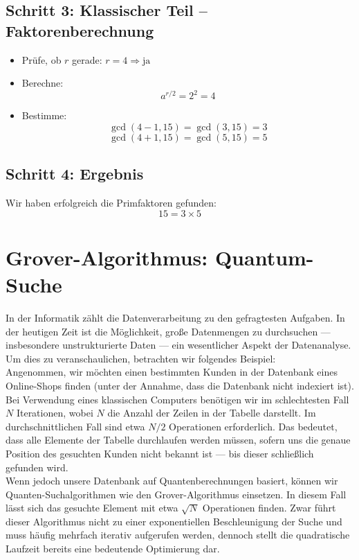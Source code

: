 \subsection*{Schritt 3: Klassischer Teil – Faktorenberechnung}

\begin{itemize}
    \item Prüfe, ob \( r \) gerade: \( r = 4 \Rightarrow \text{ja} \)
    \item Berechne:
    \[
    a^{r/2} = 2^2 = 4
    \]
    \item Bestimme:
    \[
    \gcd(4 - 1, 15) = \gcd(3, 15) = 3
    \]
    \[
    \gcd(4 + 1, 15) = \gcd(5, 15) = 5
    \]
\end{itemize}

\subsection*{Schritt 4: Ergebnis}
Wir haben erfolgreich die Primfaktoren gefunden:
\[
15 = 3 \times 5
\]

\section{Grover-Algorithmus: Quantum-Suche}
\label{sec:grover-algorithm}
In der Informatik zählt die Datenverarbeitung zu den gefragtesten Aufgaben. In der heutigen Zeit ist die Möglichkeit, große Datenmengen zu durchsuchen — insbesondere unstrukturierte Daten — ein wesentlicher Aspekt der Datenanalyse. Um dies zu veranschaulichen, betrachten wir folgendes Beispiel:\\ 

Angenommen, wir möchten einen bestimmten Kunden in der Datenbank eines Online-Shops finden (unter der Annahme, dass die Datenbank nicht indexiert ist). Bei Verwendung eines klassischen Computers benötigen wir im schlechtesten Fall $N$ Iterationen, wobei $N$ die Anzahl der Zeilen in der Tabelle darstellt. Im durchschnittlichen Fall sind etwa $N/2$ Operationen erforderlich. Das bedeutet, dass alle Elemente der Tabelle durchlaufen werden müssen, sofern uns die genaue Position des gesuchten Kunden nicht bekannt ist — bis dieser schließlich gefunden wird.\\

Wenn jedoch unsere Datenbank auf Quantenberechnungen basiert, können wir Quanten-Suchalgorithmen wie den Grover-Algorithmus einsetzen. In diesem Fall lässt sich das gesuchte Element mit etwa $\sqrt{N}$ Operationen finden. Zwar führt dieser Algorithmus nicht zu einer exponentiellen Beschleunigung der Suche und muss häufig mehrfach iterativ aufgerufen werden, dennoch stellt die quadratische Laufzeit bereits eine bedeutende Optimierung dar.


